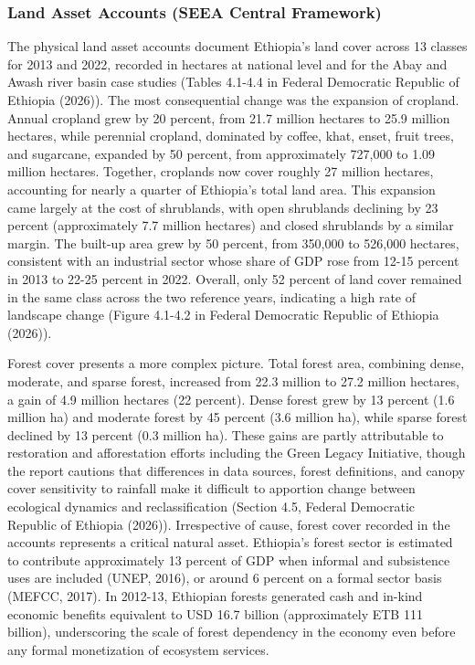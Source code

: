 \documentclass[
  letterpaper,
  DIV=11,
  numbers=noendperiod]{scrartcl}
\begin{document}
\subsubsection{Land Asset Accounts (SEEA Central
Framework)}\label{land-asset-accounts-seea-central-framework}

The physical land asset accounts document Ethiopia's land cover across
13 classes for 2013 and 2022, recorded in hectares at national level and
for the Abay and Awash river basin case studies (Tables 4.1-4.4 in
Federal Democratic Republic of Ethiopia (2026)). The most consequential
change was the expansion of cropland. Annual cropland grew by 20
percent, from 21.7 million hectares to 25.9 million hectares, while
perennial cropland, dominated by coffee, khat, enset, fruit trees, and
sugarcane, expanded by 50 percent, from approximately 727,000 to 1.09
million hectares. Together, croplands now cover roughly 27 million
hectares, accounting for nearly a quarter of Ethiopia's total land area.
This expansion came largely at the cost of shrublands, with open
shrublands declining by 23 percent (approximately 7.7 million hectares)
and closed shrublands by a similar margin. The built-up area grew by 50
percent, from 350,000 to 526,000 hectares, consistent with an industrial
sector whose share of GDP rose from 12-15 percent in 2013 to 22-25
percent in 2022. Overall, only 52 percent of land cover remained in the
same class across the two reference years, indicating a high rate of
landscape change (Figure 4.1-4.2 in Federal Democratic Republic of
Ethiopia (2026)).

Forest cover presents a more complex picture. Total forest area,
combining dense, moderate, and sparse forest, increased from 22.3
million to 27.2 million hectares, a gain of 4.9 million hectares (22
percent). Dense forest grew by 13 percent (1.6 million ha) and moderate
forest by 45 percent (3.6 million ha), while sparse forest declined by
13 percent (0.3 million ha). These gains are partly attributable to
restoration and afforestation efforts including the Green Legacy
Initiative, though the report cautions that differences in data sources,
forest definitions, and canopy cover sensitivity to rainfall make it
difficult to apportion change between ecological dynamics and
reclassification (Section 4.5, Federal Democratic Republic of Ethiopia
(2026)). Irrespective of cause, forest cover recorded in the accounts
represents a critical natural asset. Ethiopia's forest sector is
estimated to contribute approximately 13 percent of GDP when informal
and subsistence uses are included (UNEP, 2016), or around 6 percent on a
formal sector basis (MEFCC, 2017). In 2012-13, Ethiopian forests
generated cash and in-kind economic benefits equivalent to USD 16.7
billion (approximately ETB 111 billion), underscoring the scale of
forest dependency in the economy even before any formal monetization of
ecosystem services.
\end{document}
